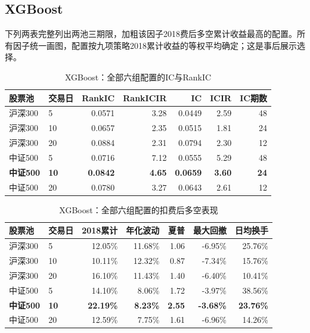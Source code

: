 \subsection{XGBoost}
下列两表完整列出两池三期限，加粗该因子2018费后多空累计收益最高的配置。所有因子统一画图，配置按九项策略2018累计收益的等权平均确定；这是事后展示选择。
\begin{table}[H]\centering\normalsize\setlength{\tabcolsep}{3.5pt}
\caption{XGBoost：全部六组配置的IC与RankIC}\begin{tabular}{llrrrrr}\toprule
股票池 & 交易日 & RankIC & RankICIR & IC & ICIR & IC期数\\\midrule
沪深300 & 5 & 0.0571 & 3.28 & 0.0449 & 2.59 & 48 \\
沪深300 & 10 & 0.0657 & 2.35 & 0.0515 & 1.81 & 24 \\
沪深300 & 20 & 0.0884 & 2.31 & 0.0794 & 2.30 & 12 \\
中证500 & 5 & 0.0716 & 7.12 & 0.0555 & 5.29 & 48 \\
\textbf{中证500} & \textbf{10} & \textbf{0.0842} & \textbf{4.65} & \textbf{0.0659} & \textbf{3.60} & \textbf{24} \\
中证500 & 20 & 0.0780 & 3.27 & 0.0643 & 2.61 & 12 \\
\bottomrule\end{tabular}\end{table}
\begin{table}[H]\centering\normalsize\setlength{\tabcolsep}{3.5pt}
\caption{XGBoost：全部六组配置的扣费后多空表现}\begin{tabular}{llrrrrr}\toprule
股票池 & 交易日 & 2018累计 & 年化波动 & 夏普 & 最大回撤 & 日均换手\\\midrule
沪深300 & 5 & 12.05\% & 11.68\% & 1.06 & -6.95\% & 25.76\% \\
沪深300 & 10 & 10.11\% & 12.32\% & 0.87 & -7.34\% & 15.76\% \\
沪深300 & 20 & 16.10\% & 11.43\% & 1.40 & -6.40\% & 10.41\% \\
中证500 & 5 & 14.10\% & 8.06\% & 1.72 & -3.97\% & 38.56\% \\
\textbf{中证500} & \textbf{10} & \textbf{22.19\%} & \textbf{8.23\%} & \textbf{2.55} & \textbf{-3.68\%} & \textbf{23.76\%} \\
中证500 & 20 & 12.59\% & 7.75\% & 1.61 & -6.96\% & 14.26\% \\
\bottomrule\end{tabular}\end{table}
\clearpage
{}
